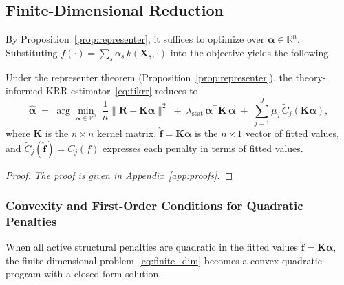 \subsection{Finite-Dimensional Reduction}
\label{sub:finite_dim}

By Proposition~\ref{prop:representer}, it suffices to optimize
over $\boldsymbol{\alpha} \in \mathbb{R}^n$.
Substituting $f(\cdot) = \sum_s \alpha_s\, k(\mathbf{X}_s, \cdot)$ into
the objective yields the following.

\begin{proposition}
\label{prop:finite_dim}
Under the representer theorem (Proposition~\ref{prop:representer}),
the theory-informed KRR estimator~\eqref{eq:tikrr} reduces to
\begin{equation}
\label{eq:finite_dim}
\hat{\boldsymbol{\alpha}} \;=\; \arg\min_{\boldsymbol{\alpha} \in \mathbb{R}^n} \;
\frac{1}{n}\|\mathbf{R} - \mathbf{K}\boldsymbol{\alpha}\|^2
\;+\;
\lambda_{\mathrm{stat}}\,\boldsymbol{\alpha}^\top \mathbf{K}\, \boldsymbol{\alpha}
\;+\;
\sum_{j=1}^{J} \mu_j\, \tilde{C}_j(\mathbf{K}\boldsymbol{\alpha}),
\end{equation}
where $\mathbf{K}$ is the $n \times n$ kernel matrix,
$\hat{\mathbf{f}} = \mathbf{K}\boldsymbol{\alpha}$ is the $n \times 1$
vector of fitted values, and
$\tilde{C}_j(\hat{\mathbf{f}}) = C_j(f)$ expresses each penalty
in terms of fitted values.
\end{proposition}

\begin{proof}
\emph{The proof is given in Appendix~\ref{app:proofs}.}
\end{proof}

\subsubsection{Convexity and First-Order Conditions for Quadratic Penalties}
\label{sub:foc}

When all active structural penalties are quadratic in the fitted values
$\hat{\mathbf{f}} = \mathbf{K}\boldsymbol{\alpha}$, the finite-dimensional
problem~\eqref{eq:finite_dim} becomes a convex quadratic program with
a closed-form solution.

